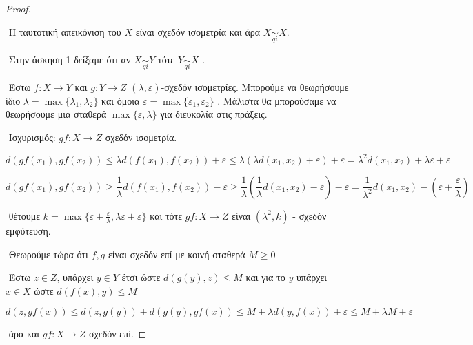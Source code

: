 \documentclass[oneside,a4paper]{article}
\begin{document}
\begin{proof} $ $

$ $\newline
Η ταυτοτική απεικόνιση του $X$ είναι σχεδόν ισομετρία και άρα $X\underset{qi}{\sim} X$.

$ $\newline
Στην άσκηση 1 δείξαμε ότι αν $X\underset{qi}{\sim} Y$ τότε $Y \underset{qi}{\sim} X$ .

$ $\newline
Έστω $f: X \rightarrow Y$ και $g:Y\rightarrow Z$ $(\lambda,\varepsilon)$-σχεδόν ισομετρίες. Μπορούμε να θεωρήσουμε ίδιο $\lambda = \max \{\lambda_1,\lambda_2\}$ και όμοια $\varepsilon = \max \{\varepsilon_1,\varepsilon_2\}$ . Μάλιστα θα μπορούσαμε να θεωρήσουμε μια σταθερά $\max \{\varepsilon,\lambda \}$ για διευκολία στις πράξεις.

$ $\newline
Ισχυρισμός: $gf : X \rightarrow Z$ σχεδόν ισομετρία.

$$d(gf(x_1),gf(x_2)) \leq \lambda d(f(x_1),f(x_2)) + \varepsilon \leq \lambda \left(\lambda d(x_1,x_2) +  \varepsilon \right) + \varepsilon = \lambda^2 d(x_1,x_2) + \lambda \varepsilon + \varepsilon$$

$$d(gf(x_1),gf(x_2)) \geq \frac1{\lambda} d(f(x_1),f(x_2)) - \varepsilon \geq  \frac1{\lambda} \left( \frac1{\lambda} d(x_1,x_2) - \varepsilon \right)  - \varepsilon  = \frac1{\lambda^2} d(x_1,x_2) - (\varepsilon + \frac{\varepsilon}{\lambda})$$

$ $\newline
θέτουμε $k = \max \{\varepsilon + \frac{\varepsilon}{\lambda}, \lambda \varepsilon + \varepsilon\}$ και τότε $gf : X \rightarrow Z$ είναι $(\lambda^2,k)$ - σχεδόν εμφύτευση.

$ $\newline
Θεωρούμε τώρα ότι $f,g$ είναι σχεδόν επί με κοινή σταθερά $M \geq 0$

$ $\newline
Έστω $z \in Z$, υπάρχει $y \in Y$ έτσι ώστε $d(g(y),z) \leq M$ και για το $y$ υπάρχει $x \in X$ ώστε $d(f(x),y) \leq M$


$$d(z,gf(x)) \leq d(z,g(y)) + d(g(y),gf(x)) \leq M + \lambda d(y,f(x)) + \varepsilon \leq M + \lambda M + \varepsilon$$

$ $\newline
άρα και $gf :X\rightarrow Z$ σχεδόν επί.


\end{proof}

\pagebreak
\end{document}
